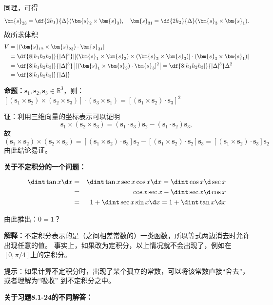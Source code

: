 同理，可得
$$\bm{s}_{23}=\df{2h_1}{\Delta}(\bm{s}_2\times\bm{s}_3),\quad
\bm{s}_{31}=\df{2h_2}{\Delta}(\bm{s}_3\times\bm{s}_1).$$
故所求体积
\begin{align*}
	V&=|(\bm{s}_{12}\times\bm{s}_{23})\cdot\bm{s}_{31}|\\
	&=\df{8|h_1h_2h_3|}{|\Delta|^3}|[(\bm{s}_1\times\bm{s}_2)\times(\bm{s}_2\times\bm{s}_3)]
	\cdot(\bm{s}_3\times\bm{s}_1)|\\
	&=\df{8|h_1h_2h_3|}{|\Delta|^3}
	\left|[(\bm{s}_1\times\bm{s}_2)\cdot\bm{s}_3]^2\right|
	=\df{8|h_1h_2h_3|}{|\Delta|^3}\Delta^2\\
	&=\df{8|h_1h_2h_3|}{|\Delta|}
\end{align*}


\begin{shaded}
	{\bf 命题：}$\bm{s}_1,\bm{s}_2,\bm{s}_3\in\mathbb{R}^3$，则：
	$\left[(\bm{s}_1\times\bm{s}_2)\times(\bm{s}_2\times\bm{s}_3)\right]
	\cdot(\bm{s}_3\times\bm{s}_1)=
	\left[(\bm{s}_1\times\bm{s}_2)\cdot\bm{s}_3\right]^2$
	
	证：利用三维向量的坐标表示可以证明
	$$\bm{s}_1\times(\bm{s}_2\times\bm{s}_3)
	=(\bm{s}_1\cdot\bm{s}_3)\bm{s}_2
	-(\bm{s}_1\cdot\bm{s}_2)\bm{s}_3,$$
	故
	$$(\bm{s}_1\times\bm{s}_2)\times(\bm{s}_2\times\bm{s}_3)
	=[(\bm{s}_1\times\bm{s}_2)\cdot\bm{s}_3]\bm{s}_2
	-[(\bm{s}_1\times\bm{s}_2)\cdot\bm{s}_2]\bm{s}_3
	=[(\bm{s}_1\times\bm{s}_2)\cdot\bm{s}_3]\bm{s}_2$$
	由此结论易证。
\end{shaded}

\ifvisible

\newpage

{\bf 关于不定积分的一个问题：}

\begin{eqnarray*}
	\dint\tan x\d x & = & \dint\tan x\sec x\cos x\d x=\dint\cos x\d\sec x\\
	& = & \cos x\sec x-\dint\sec x\d\cos x\\
	& = & 1+\dint\sec x\sin x\d x
	= 1+\dint\tan x\d x
\end{eqnarray*}

由此推出：$0=1$？

{\bf 解释：}不定积分表示的是（之间相差常数的）一类函数，所以等式两边消去时允许出现任意的值。
事实上，如果改为定积分，以上情况就不会出现了，例如在$[0,\pi/4]$上的定积分。

提示：如果计算不定积分时，出现了某个孤立的常数，可以将该常数直接“舍去”，或者理解为“吸收”
到不定积分之中。

\newpage

{\bf 关于习题8.1-24的不同解答：}

